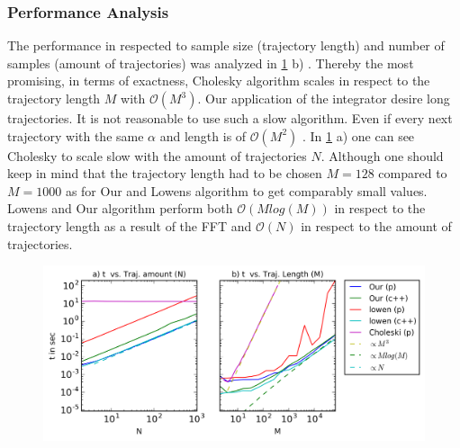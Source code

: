 \documentclass[
  a4paper,BCOR10mm,oneside,
  headsepline,footsepline,%
  fleqn,openbib
]{scrbook}
\begin{document}
\subsubsection{Performance Analysis}
The performance in respected to sample size (trajectory length) and number of samples (amount of trajectories) was analyzed in \cref{fig:200} b) . Thereby the most promising, in terms of exactness, Cholesky algorithm scales in respect to the trajectory length $M$ with $\mathcal{O}(M^3)$. Our application of the integrator desire long trajectories. It is not reasonable to use such a slow algorithm. Even if every next trajectory with the same $\alpha$ and length is of  $\mathcal{O}(M^2)$ \cite{Dieker2004}. In \cref{fig:200} a) one can see Cholesky to scale slow with the amount of trajectories $N$. Although one should keep in mind that the trajectory length had to be chosen $M=128$ compared to $M=1000$ as for Our and Lowens algorithm to get comparably small values. Lowens and Our algorithm perform both $\mathcal{O}(M log(M))$ in respect to the trajectory length as a result of the FFT and $\mathcal{O}(N)$ in respect to the amount of trajectories.
\begin{figure}[h!]
  \centering
  \includegraphics[width=\linewidth]{./data/profilingneu1.png}
  \captionsetup{width=0.9\linewidth}
  \label{fig:200}
\end{figure}
\end{document}
